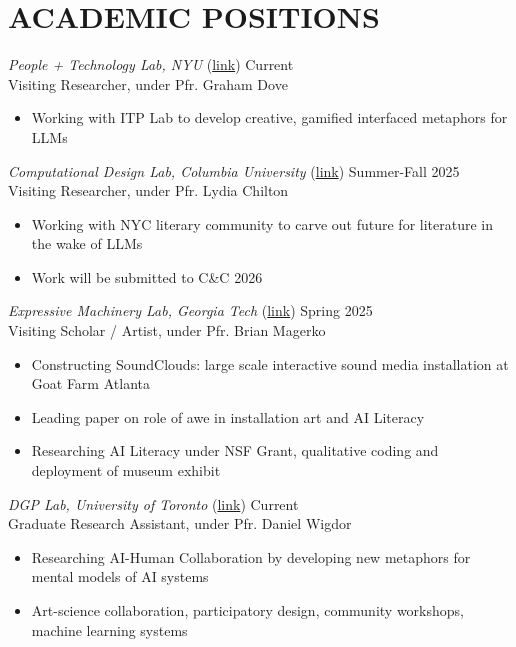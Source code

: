 \section{ACADEMIC POSITIONS}

{\sl People + Technology Lab, NYU} (\href{https://www.codesignwithdata.com/}{link})\hfill
Current \\
Visiting Researcher, under Pfr. Graham Dove  \\
\begin{itemize}
\item Working with ITP Lab to develop creative, gamified interfaced metaphors for LLMs
\end{itemize}

{\sl Computational Design Lab, Columbia University} (\href{https://www.cs.columbia.edu/~chilton/chilton.html}{link})\hfill
Summer-Fall 2025 \\
Visiting Researcher, under Pfr. Lydia Chilton  \\
\begin{itemize}
\item Working with NYC literary community to carve out future for literature in the wake of LLMs
\item Work will be submitted to C\&C 2026
\end{itemize}

{\sl Expressive Machinery Lab, Georgia Tech} (\href{https://expressivemachinery.gatech.edu/}{link})\hfill
Spring 2025 \\
Visiting Scholar / Artist, under Pfr. Brian Magerko  \\
\begin{itemize}
\item Constructing SoundClouds: large scale interactive sound media installation at
Goat Farm Atlanta
\item Leading paper on role of awe in installation art and AI Literacy
\item Researching AI Literacy under NSF Grant, qualitative coding and deployment
of museum exhibit
\end{itemize}

{\sl DGP Lab, University of Toronto} (\href{https://www.dgp.toronto.edu/~dwigdor/}{link})\hfill
Current \\
Graduate Research Assistant, under Pfr. Daniel Wigdor \\
\begin{itemize}
\item Researching AI-Human Collaboration by developing new metaphors for mental models of AI systems
\item  Art-science collaboration, participatory design, community workshops, machine learning systems
\end{itemize}

